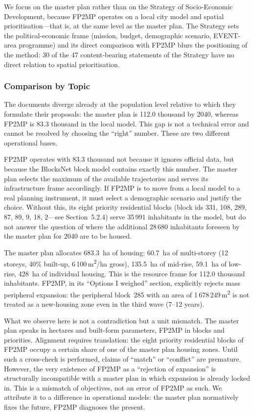 We focus on the master plan rather than on the Strategy of Socio-Economic Development, because FP2MP operates on a local city model and spatial prioritisation---that is, at the same level as the master plan. The Strategy sets the political-economic frame (mission, budget, demographic scenario, EVENT-area programme) and its direct comparison with FP2MP blurs the positioning of the method: 30 of the 47 content-bearing statements of the Strategy have no direct relation to spatial prioritisation.
 
\subsubsection{Comparison by Topic}
\label{sec:comparison-topics}
 
The documents diverge already at the population level relative to which they formulate their proposals: the master plan is 112.0 thousand by 2040, whereas FP2MP is 83.3 thousand in the local model. This gap is not a technical error and cannot be resolved by choosing the ``right'' number. These are two different operational bases.
 
FP2MP operates with 83.3 thousand not because it ignores official data, but because the BlocksNet block model contains exactly this number. The master plan selects the maximum of the available trajectories and serves its infrastructure frame accordingly. If FP2MP is to move from a local model to a real planning instrument, it must select a demographic scenario and justify the choice. Without this, its eight priority residential blocks (block ids 331, 108, 289, 87, 89, 9, 18, 2---see Section~5.2.4) serve 35\,991 inhabitants in the model, but do not answer the question of where the additional 28\,680 inhabitants foreseen by the master plan for 2040 are to be housed.
 
The master plan allocates 683.3~ha of housing: 60.7~ha of multi-storey (12 storeys, 40\% built-up, 6\,100\,m\textsuperscript{2}/ha gross), 135.5~ha of mid-rise, 59.1~ha of low-rise, 428~ha of individual housing. This is the resource frame for 112.0 thousand inhabitants. FP2MP, in its ``Options I weighed'' section, explicitly rejects mass peripheral expansion: the peripheral block~285 with an area of 1\,678\,249\,m\textsuperscript{2} is not treated as a new-housing zone even in the third wave (7--12 years).
 
What we observe here is not a contradiction but a unit mismatch. The master plan speaks in hectares and built-form parameters, FP2MP in blocks and priorities. Alignment requires translation: the eight priority residential blocks of FP2MP occupy a certain share of one of the master plan housing zones. Until such a cross-check is performed, claims of ``match'' or ``conflict'' are premature. However, the very existence of FP2MP as a ``rejection of expansion'' is structurally incompatible with a master plan in which expansion is already locked in. This is a mismatch of objectives, not an error of FP2MP as such. We attribute it to a difference in operational models: the master plan normatively fixes the future, FP2MP diagnoses the present.
 
